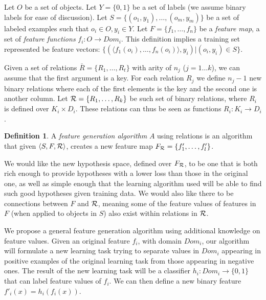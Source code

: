 \documentclass[letterpaper]{article}
\theoremstyle{definition}
\newtheorem{defn}{Definition}[section]
\begin{document}
Let $O$ be a set of objects. Let $Y=\{0,1\}$ be a set of labels (we assume binary labels for ease of discussion). Let $S=\{(o_{1},y_{1}),\ldots,(o_{m},y_{m})\}$ be a set of labeled examples such that $o_{i}\in O, y_{i}\in Y$. Let $F=\{f_{1},\ldots,f_{n}\}$ be a \emph{feature map}, a set of \emph{feature functions} $f_{i}:O\rightarrow Dom_{i}$.  This definition implies a training set represented be feature vectors: $\{ (\langle f_1(o_i),\ldots,f_n(o_i)\rangle, y_i) | (o_i,y_i) \in S\}$.


Given a set of relations $\bar{R}=\{R_{1},\ldots,R_{t}\}$ with arity of $n_{j}$ ($j=1\ldots k$), we can assume  that the first argument is a key. For each relation $R_{j}$ we define $n_{j}-1$ new binary relations where each of the first elements is the key and the second one is another column.
Let ${\cal R}=\{R_{1},\ldots,R_{k}\}$ be such set of binary relations, where $R_{i}$ is defined over $K_{i}\times D_{i}$. These relations can thus be seen as functions $R_{i}: K_{i}\rightarrow D_{i}$.

\begin{defn}
A \emph{feature generation algorithm} $A$ using relations is an algorithm that given $\langle S,F,{\cal R} \rangle$, creates a new feature map $F_{\cal R}=\{f'_{1},\ldots,f'_{l}\}$.
\end{defn}

We would like the new hypothesis space, defined over $F_{\cal R}$, to be one that is both rich enough to provide hypotheses with a lower loss than those in the original one, as well as simple enough that the learning algorithm used will be able to find such good hypotheses given training data.
We would also like there to be connections between $F$ and ${\cal R}$, meaning some of the feature values of features in $F$ (when applied to objects in $S$) also exist within relations in $\cal R$.

We propose a general feature generation algorithm using additional knowledge on feature values.
Given an original feature $f_{i}$, with domain $Dom_i$, our algorithm will formulate a new learning task trying to separate values in $Dom_i$ appearing in positive examples of the original learning task from those appearing in negative ones.  The result of the new learning task will be a classifier
$h_{i}:Dom_{i}\rightarrow \{0,1\}$ that can label feature values of $f_{i}$. We can then define a new binary feature $f'_{i}(x)=h_{i}(f_{i}(x))$.
\end{document}

